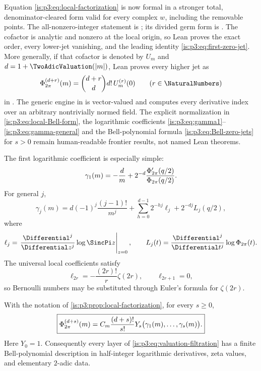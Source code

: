 \begin{statusbox}
Equation \eqref{is:p3:eq:local-factorization} is now formal in a stronger total,
denominator-cleared form valid for every complex \(w\), including the
removable points.  The all-nonzero-integer statement is
; its divided
germ form is
.
The cofactor is analytic and nonzero at the local origin, so Lean proves the exact order, every
lower-jet vanishing, and the leading identity
\eqref{is:p3:eq:first-zero-jet}.  More generally, if that cofactor is denoted by
\(U_m\) and \(d=1+\TwoAdicValuation(|m|)\), Lean proves every higher jet as
\[
 \PhiCyc^{(d+r)}(m)=\binom{d+r}{d}d!\,U_m^{(r)}(0)
 \qquad(r\in\NaturalNumbers)
\]
in .
The generic engine in  is vector-valued and computes
every derivative index over an arbitrary nontrivially normed field.  The
explicit normalization in \eqref{is:p3:eq:local-Bell-form}, the logarithmic coefficients
\eqref{is:p3:eq:gamma1}--\eqref{is:p3:eq:gamma-general} and the Bell-polynomial formula
\eqref{is:p3:eq:Bell-zero-jets} for \(s>0\) remain human-readable frontier
results, not named Lean theorems.
\end{statusbox}

The first logarithmic coefficient is especially simple:
\begin{equation}
 \gamma_1(m)=-\frac d m
 +2^{-d}\frac{\Phi_{2\pi}'(q/2)}{\Phi_{2\pi}(q/2)}.
 \label{is:p3:eq:gamma1}
\end{equation}
For general $j$,
\begin{equation}
 \gamma_j(m)
 =d(-1)^j\frac{(j-1)!}{m^j}
 +\sum_{h=0}^{d-1}2^{-hj}\ell_j
 +2^{-dj}L_j(q/2),
 \label{is:p3:eq:gamma-general}
\end{equation}
where
\[
 \ell_j=\left.\frac{\Differential^j}{\Differential z^j}\log\SincPi z\right|_{z=0},
 \qquad
 L_j(t)=\frac{\Differential^j}{\Differential t^j}\log\PhiCyc(t).
\]
The universal local coefficients satisfy
\begin{equation}
 \ell_{2r}=-\frac{(2r)!}{r}\zeta(2r),
 \qquad \ell_{2r+1}=0,
 \label{is:p3:eq:sinc-log-jet}
\end{equation}
so Bernoulli numbers may be substituted through Euler's formula for $\zeta(2r)$.

\begin{corollary}
\label{is:p3:cor:Bell-zero-jets}
With the notation of \cref{is:p3:prop:local-factorization}, for every $s\ge0$,
\begin{equation}
 \boxed{\displaystyle
 \Phi_{2\pi}^{(d+s)}(m)
 =C_m\frac{(d+s)!}{s!}
 Y_s\bigl(\gamma_1(m),\ldots,\gamma_s(m)\bigr).}
 \label{is:p3:eq:Bell-zero-jets}
\end{equation}
Here $Y_0=1$.  Consequently every layer of \eqref{is:p3:eq:valuation-filtration} has a finite Bell-polynomial description in half-integer logarithmic derivatives, zeta values, and elementary $2$-adic data.
\end{corollary}

